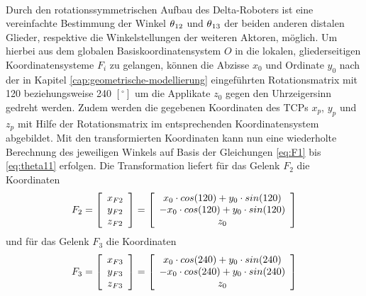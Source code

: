 \documentclass[Bachelor, BMR, ngerman]{twbook}
\begin{document}
    \\
    Durch den rotationssymmetrischen Aufbau des Delta-Roboters ist eine vereinfachte Bestimmung der Winkel $\theta\textsubscript{12}$ und $\theta\textsubscript{13}$ der beiden anderen distalen Glieder, respektive die Winkelstellungen der weiteren Aktoren, möglich. Um hierbei aus dem globalen Basiskoordinatensystem $O$ in die lokalen, gliederseitigen Koordinatensysteme $F_i$ zu gelangen, können die Abzisse $x_0$ und Ordinate $y_0$ nach der in Kapitel \ref{cap:geometrische-modellierung} eingeführten Rotationsmatrix  mit 120 beziehungsweise 240 $[^{\circ}]$ um die Applikate $z_0$ gegen den Uhrzeigersinn gedreht werden. Zudem werden die gegebenen Koordinaten des TCPs $x_p$, $y_p$ und $z_p$ mit Hilfe der Rotationsmatrix im entsprechenden Koordinatensystem abgebildet. Mit den transformierten Koordinaten kann nun eine wiederholte Berechnung des jeweiligen Winkels auf Basis der Gleichungen \ref{eq:F1} bis \ref{eq:theta11} erfolgen. Die Transformation liefert für das Gelenk $F_2$ die Koordinaten
    \newline
    \begin{align}
        F_2 =
            \left[
                \begin{array}{c} 
                    x\textsubscript{$F2$}\\
                    y\textsubscript{$F2$}\\
                    z\textsubscript{$F2$} 
                \end{array}
            \right] =
            \left[
                \begin{array}{c} 
                    x_0 \cdot cos(120) + y_0 \cdot sin(120)\\
                    - x_0 \cdot cos(120) + y_0 \cdot sin(120)\\
                    z_0 
                \end{array}
            \right]
        \label{eq:F2}
    \end{align}
    \noindent
    und für das Gelenk $F_3$ die Koordinaten
    \begin{align}
        F_3 =
            \left[
                \begin{array}{c} 
                    x\textsubscript{$F3$}\\
                    y\textsubscript{$F3$}\\
                    z\textsubscript{$F3$} 
                \end{array}
            \right] =
            \left[
                \begin{array}{c} 
                    x_0 \cdot cos(240) + y_0 \cdot sin(240)\\
                    - x_0 \cdot cos(240) + y_0 \cdot sin(240)\\
                    z_0 
                \end{array}
            \right]
        \label{eq:F3}
    \end{align}
    \noindent
    
\end{document}
